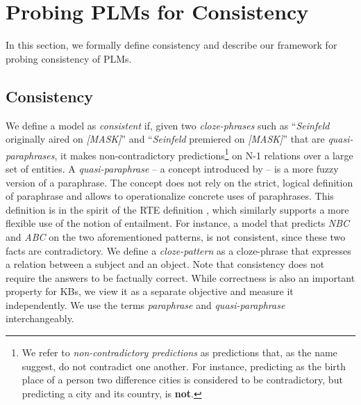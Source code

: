 \section{Probing PLMs for Consistency}
\label{sec:probe}

In this section, we formally define consistency and describe our framework for probing consistency of PLMs.



\subsection{Consistency}
We define a model as \emph{consistent} if, given  two
\textit{cloze-phrases} such as 
 ``\textit{Seinfeld} originally aired on \textit{[MASK]}'' and
``\textit{Seinfeld} premiered on \textit{[MASK]}'' that
are \textit{quasi-paraphrases}, it makes non-contradictory
predictions\footnote{We refer to \textit{non-contradictory
    predictions} as predictions that, as the name suggest,
  do not contradict one another. For instance, predicting as
  the birth place of a person two difference cities is
  considered to be contradictory, but predicting a city and
  its country, is \textbf{not}.}
on N-1 relations over a large set of entities.
A \textit{quasi-paraphrase} -- a concept introduced by \citet{what_is_paraphrase} -- is a more fuzzy version of a paraphrase. The concept does not rely on the strict, logical definition of paraphrase and allows to operationalize concrete uses of paraphrases. This definition is in the spirit of the RTE definition \cite{dagan-rte}, which similarly supports a more flexible use of the notion of entailment.
For instance, a model that predicts \textit{NBC} and \textit{ABC} on the two aforementioned patterns, is not consistent, since these two facts are contradictory. We define a \textit{cloze-pattern} as a cloze-phrase that expresses a relation between a subject and an object.
Note that consistency does not require the answers to be factually correct. While correctness is also an important property for KBs, we view it as a separate objective and measure it independently.
We use the terms \textit{paraphrase} and \textit{quasi-paraphrase} interchangeably.
 


